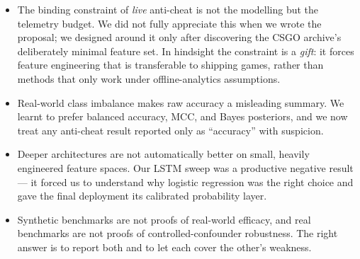 \documentclass[conference,10pt]{IEEEtran}
\begin{document}
\begin{itemize}
  \item The binding constraint of \emph{live} anti-cheat is not the
    modelling but the telemetry budget. We did not fully appreciate this
    when we wrote the proposal; we designed around it only after
    discovering the CSGO archive's deliberately minimal feature set.
    In hindsight the constraint is a \emph{gift}: it forces feature
    engineering that is transferable to shipping games, rather than
    methods that only work under offline-analytics assumptions.
  \item Real-world class imbalance makes raw accuracy a misleading
    summary. We learnt to prefer balanced accuracy, MCC, and Bayes
    posteriors, and we now treat any anti-cheat result reported only as
    ``accuracy'' with suspicion.
  \item Deeper architectures are not automatically better on small,
    heavily engineered feature spaces. Our LSTM sweep was a productive
    negative result --- it forced us to understand why logistic
    regression was the right choice and gave the final deployment its
    calibrated probability layer.
  \item Synthetic benchmarks are not proofs of real-world efficacy, and
    real benchmarks are not proofs of controlled-confounder robustness.
    The right answer is to report both and to let each cover the other's
    weakness.
\end{itemize}



\end{document}
